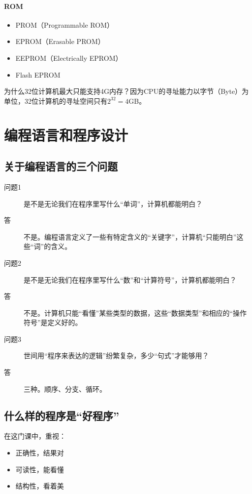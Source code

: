 \documentclass[UTF8]{ctexart}
\begin{document}
\paragraph{ROM}
\begin{itemize}
    \item PROM（Programmable ROM）
    \item EPROM（Erasable PROM）
    \item EEPROM（Electrically EPROM）
    \item Flash EPROM
\end{itemize}

为什么32位计算机最大只能支持4G内存？因为CPU的寻址能力以字节（Byte）为单位，32位计算机的寻址空间只有$2^{32}=4$GB。

\section{编程语言和程序设计}
\subsection{关于编程语言的三个问题}
\begin{description}
    \item[问题1] 是不是无论我们在程序里写什么“单词”，计算机都能明白？
    \item[答] 不是。编程语言定义了一些有特定含义的“关键字”，计算机“只能明白”这些“词”的含义。
\end{description}

\begin{description}
    \item[问题2] 是不是无论我们在程序里写什么“数”和“计算符号”，计算机都能明白？
    \item[答] 不是。计算机只能“看懂”某些类型的数据，这些“数据类型”和相应的“操作符号”是定义好的。
\end{description}

\begin{description}
    \item[问题3] 世间用“程序来表达的逻辑”纷繁复杂，多少“句式”才能够用？
    \item[答] 三种。顺序、分支、循环。
\end{description}

\subsection{什么样的程序是“好程序”}
在这门课中，重视：
\begin{itemize}
    \item 正确性，结果对
    \item 可读性，能看懂
    \item 结构性，看着美
\end{itemize}
\end{document}
